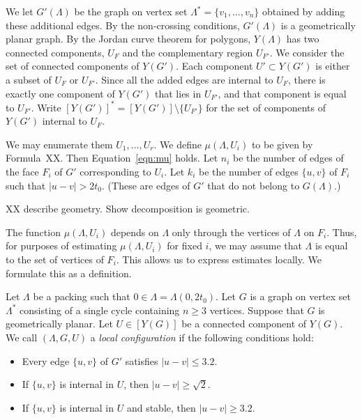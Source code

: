 We let $G'(\Lambda)$ be the graph on vertex set $\Lambda^*=\{v_1,\ldots,v_n\}$ obtained by adding these additional edges.  By the non-crossing
conditions, $G'(\Lambda)$ is a geometrically planar graph.  
By the Jordan curve theorem for polygons, $Y(\Lambda)$ has two connected 
components,
$U_F$ and the complementary region $U_{F'}$.
We consider the set of connected components of $Y(G')$.  Each
component $U'\subset Y(G')$ is either a subset of $U_F$ or $U_{F'}$.
Since all the added edges are internal to $U_F$, there is exactly
one component of $Y(G')$ that lies in $U_{F'}$, and that component
is equal to $U_{F'}$.  Write $[Y(G')]^* = [Y(G')]\setminus\{U_{F'}\}$
for the set of components of $Y(G')$ internal to $U_F$.

We may enumerate them $U_1,\ldots,U_r$.  We define
$\mu(\Lambda,U_i)$ to be given by Formula~XX.  Then
Equation~\ref{eqn:mu} holds.  Let $n_i$ be the number of edges of the face
$F_i$ of $G'$ corresponding to $U_i$.  Let $k_i$ be the number of edges
$\{u,v\}$
of $F_i$ such that $|u-v|> 2t_0$. (These are edges of $G'$ that do not
belong to $G(\Lambda)$.)  

XX describe geometry. Show decomposition is geometric.

The function $\mu(\Lambda,U_i)$ depends on $\Lambda$ only through
the vertices of $\Lambda$ on $F_i$.  Thus, for purposes of estimating
$\mu(\Lambda,U_i)$ for fixed $i$, we may assume that $\Lambda$
is equal to the set of vertices of $F_i$.  This allows us to express
estimates locally.  We formulate this as a definition.

\begin{definition}
Let $\Lambda$ be a packing such that $0\in\Lambda=\Lambda(0,2t_0)$.  
Let $G$ is a graph on vertex set $\Lambda^*$ 
consisting
of a single cycle containing $n\ge 3$ vertices.  
Suppose that $G$ is geometrically planar. 
Let $U\in [Y(G)]$ be a connected component of $Y(G)$.  
We call $(\Lambda,G,U)$ a {\it local configuration} if the
following conditions hold:
\begin{itemize}
\item Every edge $\{u,v\}$ of $G'$ satisfies $|u-v|\le 3.2$.
\item If
$\{u,v\}$ is internal in  $U$, then $|u-v|\ge \sqrt2$.
\item If $\{u,v\}$ is internal in $U$ and stable,
then $|u-v|\ge 3.2$.


\end{itemize}
\end{definition}

